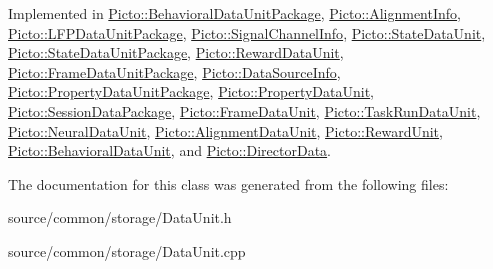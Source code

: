 Implemented in \hyperlink{class_picto_1_1_behavioral_data_unit_package_a601a643bb3b7d9d669d4b9ecd8304db4}{Picto\-::\-Behavioral\-Data\-Unit\-Package}, \hyperlink{class_picto_1_1_alignment_info_a2e6dd6969717f94d8ea694a01990c33c}{Picto\-::\-Alignment\-Info}, \hyperlink{class_picto_1_1_l_f_p_data_unit_package_aad789aa516839dbf5f776a99f56a2ffc}{Picto\-::\-L\-F\-P\-Data\-Unit\-Package}, \hyperlink{class_picto_1_1_signal_channel_info_a1a5775330e47eed5423abb9dca76af8b}{Picto\-::\-Signal\-Channel\-Info}, \hyperlink{class_picto_1_1_state_data_unit_a8259d44bb9364c40c43f040efe64d3a0}{Picto\-::\-State\-Data\-Unit}, \hyperlink{class_picto_1_1_state_data_unit_package_acca3eb97bacb1de87e99a6f01787eb84}{Picto\-::\-State\-Data\-Unit\-Package}, \hyperlink{class_picto_1_1_reward_data_unit_a1490fd9fc0456c1b3b5b3bade16d054c}{Picto\-::\-Reward\-Data\-Unit}, \hyperlink{class_picto_1_1_frame_data_unit_package_a9a81a193e3f974ce76de40839c98def3}{Picto\-::\-Frame\-Data\-Unit\-Package}, \hyperlink{class_picto_1_1_data_source_info_a5b99119b0fc8d27afd2b1b7a7e129b1e}{Picto\-::\-Data\-Source\-Info}, \hyperlink{class_picto_1_1_property_data_unit_package_a428f2dc74ecbbc0a8d88a34af6748324}{Picto\-::\-Property\-Data\-Unit\-Package}, \hyperlink{class_picto_1_1_property_data_unit_a95e9094b43ea437e1abf6c6067afb0c3}{Picto\-::\-Property\-Data\-Unit}, \hyperlink{class_picto_1_1_session_data_package_a3ec471b0a7ac49d68740809027ea0d08}{Picto\-::\-Session\-Data\-Package}, \hyperlink{class_picto_1_1_frame_data_unit_a88f06ad3057045dc6efb62932358efba}{Picto\-::\-Frame\-Data\-Unit}, \hyperlink{class_picto_1_1_task_run_data_unit_a57b03f03772b92846c7ac0f7a7532bc3}{Picto\-::\-Task\-Run\-Data\-Unit}, \hyperlink{class_picto_1_1_neural_data_unit_af4974ade183a7b579a5f8166d5994301}{Picto\-::\-Neural\-Data\-Unit}, \hyperlink{class_picto_1_1_alignment_data_unit_ab7a0a812d227c34094d05772a97d56d8}{Picto\-::\-Alignment\-Data\-Unit}, \hyperlink{class_picto_1_1_reward_unit_a543b40dc556a7b41d0a38951a8659efb}{Picto\-::\-Reward\-Unit}, \hyperlink{class_picto_1_1_behavioral_data_unit_a8d67dfb79dcfa71b91a8ae7148cc2521}{Picto\-::\-Behavioral\-Data\-Unit}, and \hyperlink{class_picto_1_1_director_data_aae2a42fd3baa601ad8034f6d3794bcd8}{Picto\-::\-Director\-Data}.



The documentation for this class was generated from the following files\-:\begin{DoxyCompactItemize}
\item 
source/common/storage/Data\-Unit.\-h\item 
source/common/storage/Data\-Unit.\-cpp\end{DoxyCompactItemize}

